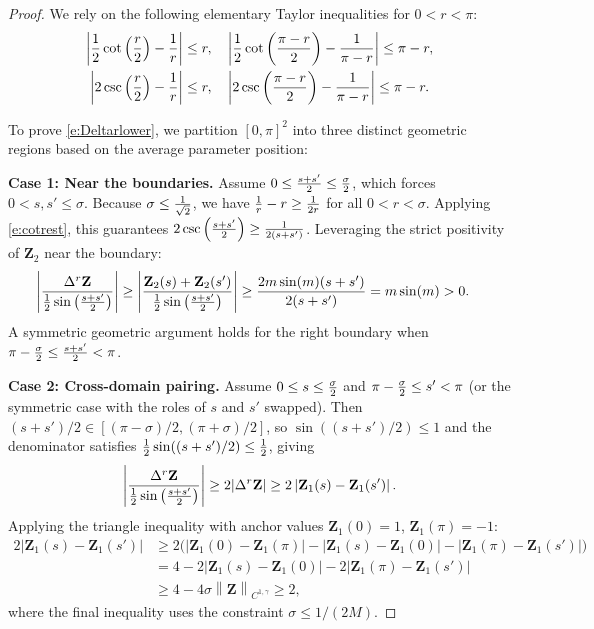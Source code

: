 \documentclass{amsart}
\newcommand{\mZ}{\mathbf{Z}}
\begin{document}
\begin{proof}
We rely on the following elementary Taylor inequalities for $0 < r < \pi$:
\begin{equation} \label{e:cotrest}
\begin{split}
\left| {1\over 2} \cot\left( {r \over 2} \right) - {1\over r} \right| \leq r, \quad 
& \left| {1\over 2} \cot\left( {\pi - r \over 2} \right) - {1\over \pi - r} \right| \leq \pi - r, \\ 
\left| 2 \csc\left( {r \over 2} \right) -  {1 \over r} \right| \leq r, \quad 
& \left| 2 \csc\left( {\pi - r \over 2} \right) -  {1 \over \pi - r} \right| \leq \pi - r.
\end{split}
\end{equation}

To prove \eqref{e:Deltarlower}, we partition $[0,\pi]^2$ into three distinct geometric regions based on the average parameter position:

\textbf{Case 1: Near the boundaries.} Assume $0 \leq {s+s' \over 2} \leq {\sigma \over 2}$, which forces $0 < s,s' \leq \sigma$. Because $\sigma \leq {1 \over \sqrt{2}}$, we have ${1 \over r} - r \geq {1\over 2r}$ for all $0 < r < \sigma$. Applying \eqref{e:cotrest}, this guarantees $2 \csc\left( {s + s' \over2} \right) \geq {1\over 2(s+ s')}$. Leveraging the strict positivity of $\mZ_2$ near the boundary:
\begin{align*}
\left|{\Delta^r \mZ \over {1\over 2} \sin\left( {s + s' \over 2} \right)} \right|
& \geq \left| {\mZ_2(s) + \mZ_2(s') \over {1\over 2} \sin\left( { s+s'\over2} \right) }\right| 
\geq {2 m \sin(m) (s+s') \over 2(s+s')}  = m\sin(m) > 0.
\end{align*}
A symmetric geometric argument holds for the right boundary when $\pi - {\sigma \over 2} \leq {s + s' \over2} < \pi$. 

\textbf{Case 2: Cross-domain pairing.} Assume $0\leq s \leq {\sigma \over 2}$ and $\pi - {\sigma \over 2} \leq s' < \pi$ (or the symmetric case with the roles of $s$ and $s'$ swapped). Then $(s+s')/2 \in [(\pi-\sigma)/2,(\pi+\sigma)/2]$, so $\sin((s+s')/2) \leq 1$ and the denominator satisfies ${1\over 2}\sin((s+s')/2) \leq \tfrac{1}{2}$, giving
\[
\left| { \Delta^r \mZ \over {1\over2} \sin\left( {s+s' \over 2} \right)} \right|
\geq 2|\Delta^r \mZ|
\geq 2\left| \mZ_1(s)  -  \mZ_1(s') \right|.
\]
Applying the triangle inequality with anchor values $\mZ_1(0)=1$, $\mZ_1(\pi)=-1$:
\begin{align*}
2\left| \mZ_1(s)  -  \mZ_1(s') \right|
&\geq 2\bigl(|\mZ_1(0) - \mZ_1(\pi)| - |\mZ_1(s) - \mZ_1(0)| - |\mZ_1(\pi) - \mZ_1(s')|\bigr) \\
&= 4 - 2 \left|  \mZ_1(s)  - \mZ_1(0) \right| - 2 \left| \mZ_1(\pi)  - \mZ_1(s') \right| \\
&\geq 4 - 4 \sigma \left\| \mZ \right\|_{C^{1,\gamma}} \geq 2,
\end{align*}
where the final inequality uses the constraint $\sigma \leq 1/(2M)$.


\end{proof}
\end{document}
